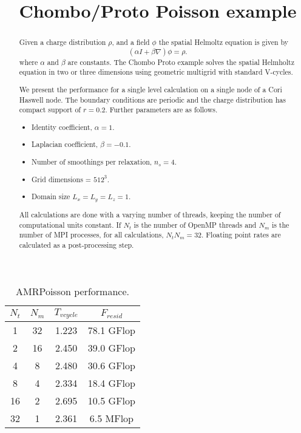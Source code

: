 \documentclass[12pt,a4paper]{article}
\title{Chombo/Proto Poisson example }
\date{}
\begin{document}
\maketitle

\begin{abstract}

Given a charge distribution $\rho$, and a field $\phi$
the spatial Helmoltz equation is given by
\begin{equation}
(\alpha I + \beta \nabla) \phi = \rho.
\end{equation}
where $\alpha$ and $\beta$ are constants.
The Chombo Proto example solves the spatial Helmholtz equation in two
or three dimensions using geometric multigrid with standard V-cycles.

We present the performance for a single level calculation on a single
node of a Cori Haswell node.    The boundary conditions are periodic
and the charge distribution has compact support of $r = 0.2$.  
Further parameters are as follows.
\begin{itemize}
\item Identity coefficient, $\alpha = 1$.
\item Laplacian coefficient, $\beta  = -0.1$.
\item Number of smoothings per relaxation, $n_{s} = 4$.
\item Grid dimensions = $512^3$.
\item Domain size $L_x=L_y=L_z =1$.
\end{itemize}

All calculations are done with a varying number of threads, keeping
the number of computational units constant.   If $N_t$ is the number
of OpenMP threads and $N_m$ is the number of MPI processes, for all
calculations, $N_t N_m = 32$.  Floating point rates are calculated as
a post-processing step.

\end{abstract}


\begin{table}[h]
\begin{center}
\begin{tabular}{|c|c||c|c|} \hline
$N_t$ & $N_m$ & $T_{vcycle}$  & $F_{resid}$  \\
\hline 
1  &  32 &    1.223  & 78.1 GFlop \\ 
2  &  16 &    2.450  & 39.0 GFlop \\ 
4  &  8  &    2.480  & 30.6 GFlop \\ 
8  &  4  &    2.334  & 18.4 GFlop \\ 
16 &  2  &    2.695  & 10.5 GFlop \\
32 &  1  &    2.361  &  6.5 MFlop \\
\hline 
\end{tabular}
\end{center}
\caption{AMRPoisson performance.  } 
\label{fig::solut2dl0}
\end{table}
\end{document}

